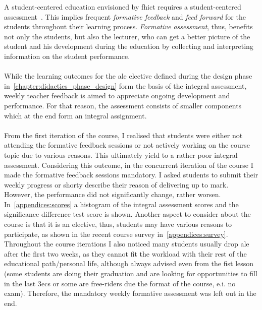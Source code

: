 A student-centered education envisioned by \acrshort{fhict} requires a student-centered assessment~\cite{FHICTAssesmentPolicy}. 
This implies frequent \textit{formative feedback} and \textit{feed forward} for the students throughout their learning process. 
\textit{Formative assessment}, thus, benefits not only the students, but also the lecturer, who can get a better picture of the student and his development during the education by collecting and interpreting information on the student performance.\\\\
While the learning outcomes for the \acrshort{ale} elective defined during the design phase in~\cref{chapter:didactics_phase_design} form the basis of the integral assessment, weekly teacher feedback is aimed to appreciate ongoing development and performance.
For that reason, the assessment consists of smaller components which at the end form an integral assignment.\\\\
From the first iteration of the course, I realised that students were either not attending the formative feedback sessions or not actively working on the course topic due to various reasons. 
This ultimately yield to a rather poor integral assessment. 
Considering this outcome, in the concurrent iteration of the course I made the formative feedback sessions mandatory.
I asked students to submit their weekly progress or shorty describe their reason of delivering up to mark. However, the performance did not significantly change, rather worsen.
In~\cref{appendices:scores} a histogram of the integral assessment scores and the significance difference test score is shown. Another aspect to consider about the course is that it is an elective, thus, students may have various reasons to participate, as shown in the recent course survey in~\cref{appendices:survey}. Throughout the course iterations I also noticed many students usually drop \acrshort{ale} after the first two weeks, as they cannot fit the workload with their rest of the educational path/personal life, although always advised even from the fist lesson (some students are doing their graduation and are looking for opportunities to fill in the last 3\Gls{ec}s or some are free-riders due the format of the course, e.i. no exam). Therefore, the mandatory weekly formative assessment was left out in the end.